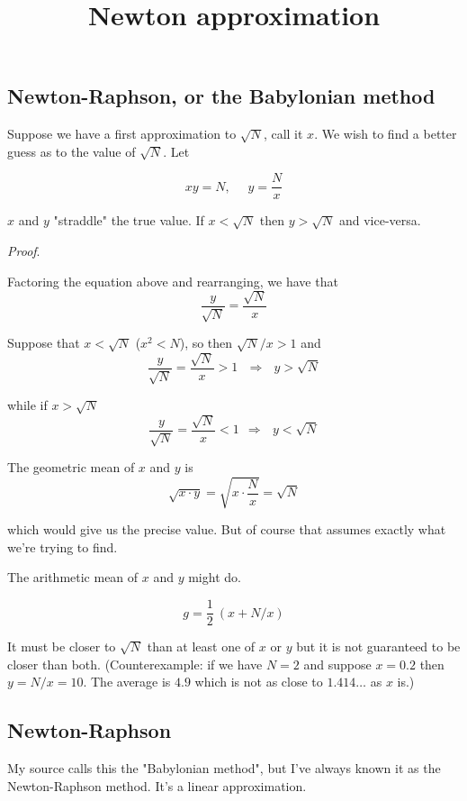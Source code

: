 \documentclass[11pt, oneside]{article}
\title{Newton approximation}
\date{}
\begin{document}
\maketitle
\Large


\subsection*{Newton-Raphson, or the Babylonian method}

Suppose we have a first approximation to $\sqrt{N}$, call it $x$.  We wish to find a better guess as to the value of $\sqrt{N}$.  Let

\[ xy = N, \ \ \ \ \ \ y = \frac{N}{x} \]

$x$ and $y$ "straddle" the true value.  If $x < \sqrt{N}$ then $y > \sqrt{N}$ and vice-versa.

\emph{Proof}.  

Factoring the equation above and rearranging, we have that
\[ \frac{y}{\sqrt{N}} = \frac{\sqrt{N}}{x} \]

Suppose that $x < \sqrt{N}$ ($x^2 < N$), so then $\sqrt{N}/x > 1$ and
\[ \frac{y}{\sqrt{N}} = \frac{\sqrt{N}}{x}  > 1 \ \ \ \Rightarrow \ \ \  y > \sqrt{N} \]

while if $x > \sqrt{N}$
\[ \frac{y}{\sqrt{N}} = \frac{\sqrt{N}}{x} < 1 \ \ \Rightarrow \ \ \  y < \sqrt{N} \]

The geometric mean of $x$ and $y$ is
\[ \sqrt{x \cdot y} = \sqrt{x \cdot \frac{N}{x}} = \sqrt{N} \]

which would give us the precise value.  But of course that assumes exactly what we're trying to find.  

The arithmetic mean of $x$ and $y$ might do.  

\[ g = \frac{1}{2} \ (x + N/x) \]

It must be closer to $\sqrt{N}$ than at least one of $x$ or $y$ but it is not guaranteed to be closer than both.  (Counterexample:  if we have $N = 2$ and suppose $x = 0.2$ then $y = N/x = 10$.  The average is $4.9$ which is not as close to $1.414 \dots$ as $x$ is.)

\subsection*{Newton-Raphson}

My source calls this the "Babylonian method", but I've always known it as the Newton-Raphson method.  It's a linear approximation.  
\end{document}
